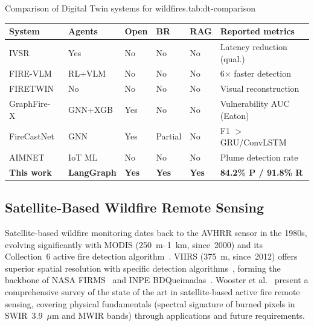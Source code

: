 \documentclass[preprint,12pt,times,numbers]{elsarticle}
\begin{document}
\begin{resulttable}{Comparison of Digital Twin systems for wildfires.}{tab:dt-comparison}
\footnotesize
\begin{tabular}{@{}lp{1.6cm}p{1.0cm}p{0.9cm}p{0.9cm}p{2.6cm}@{}}
\toprule
\textbf{System} & \textbf{Agents} & \textbf{Open} & \textbf{BR} & \textbf{RAG} & \textbf{Reported metrics} \\
\midrule
IVSR~\cite{article:morsali2026} & Yes & No & No & No & Latency reduction (qual.) \\
FIRE-VLM~\cite{article:webb2026} & RL+VLM & No & No & No & 6$\times$ faster detection \\
FIRETWIN~\cite{article:raha2025} & No & No & No & No & Visual reconstruction \\
GraphFire-X~\cite{article:esparza2025} & GNN+XGB & Yes & No & No & Vulnerability AUC (Eaton) \\
FireCastNet~\cite{article:michail2025} & GNN & Yes & Partial & No & F1 $>$ GRU/ConvLSTM \\
AIMNET~\cite{article:aimnet2025} & IoT ML & No & No & No & Plume detection rate \\
\textbf{This work} & \textbf{LangGraph} & \textbf{Yes} & \textbf{Yes} & \textbf{Yes} & \textbf{84.2\% P / 91.8\% R} \\
\bottomrule
\end{tabular}
\end{resulttable}

\subsection{Satellite-Based Wildfire Remote Sensing}

Satellite-based wildfire monitoring dates back to the AVHRR sensor in the 1980s, evolving significantly with MODIS (250~m--1~km, since~2000) and its Collection~6 active fire detection algorithm~\cite{article:giglio2016}. VIIRS (375~m, since~2012) offers superior spatial resolution with specific detection algorithms~\cite{article:schroeder2014}, forming the backbone of NASA FIRMS~\cite{manual:firms2024} and INPE BDQueimadas~\cite{article:inpe2023}. Wooster et al.~\cite{article:wooster2021} present a comprehensive survey of the state of the art in satellite-based active fire remote sensing, covering physical fundamentals (spectral signature of burned pixels in SWIR~3.9~$\mu$m and MWIR bands) through applications and future requirements.
\end{document}
